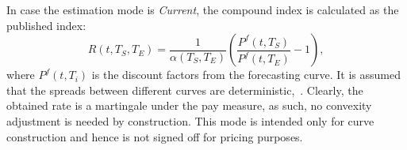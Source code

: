 \documentclass[]{pmv_report} %
\begin{document}
%
%


In case the estimation mode is \textit{Current}, the compound index is calculated as the published index:
\begin{equation*}
  R(t,T_S,T_E)=\frac{1}{\alpha(T_S,T_E)}\left( \frac{P^f(t,T_S)}{P^f(t,T_E)} -1\right),
\end{equation*}
where $P^f(t,T_i)$ is the discount factors from the forecasting curve.
It is assumed that the spreads between different curves are deterministic,~\cite{Mx.RateCurve}.
Clearly, the obtained rate is a martingale under the pay measure, as such, no convexity adjustment is needed by construction.
This mode is intended only for curve construction and hence is not signed off for pricing purposes.
\end{document}
